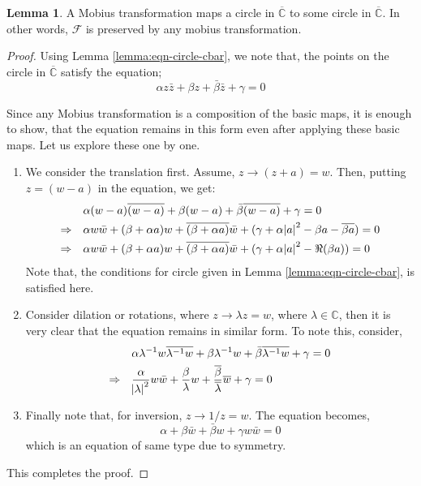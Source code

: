 \documentclass[12pt]{article}
\newcommand{\C}{\mathbb{C}}
\newcommand{\Cinf}{\overline{\C}}
\theoremstyle{definition}
\newtheorem{lem}{Lemma}
\newenvironment{lemma}{
\begin{tcolorbox}[colback=green!5!white,colframe=green!75!black, parbox = false]\begin{lem} }{\end{lem}\end{tcolorbox} }
\begin{document}
\begin{lemma}
    A Mobius transformation maps a circle in $\Cinf$ to some circle in $\Cinf$. In other words, $\mathcal{F}$ is preserved by any mobius transformation.
    \label{lemma:mobius-circ-to-circ}
\end{lemma}

\begin{proof}
    Using Lemma \ref{lemma:eqn-circle-cbar}, we note that, the points on the circle in $\Cinf$ satisfy the equation;
    $$\alpha z \bar{z} + \beta z + \bar{\beta}\bar{z} + \gamma = 0$$
    
    Since any Mobius transformation is a composition of the basic maps, it is enough to show, that the equation remains in this form even after applying these basic maps. Let us explore these one by one.
    
    \begin{enumerate}
        \item We consider the translation first. Assume, $z \rightarrow (z + a) = w$. Then, putting $z = (w - a)$ in the equation, we get: 
        \begin{align*}
            & \quad \alpha (w-a) \overline{(w - a)} + \beta (w - a) + \bar{\beta}\overline{(w - a)} + \gamma = 0\\
            \Rightarrow &\quad  \alpha w\bar{w} + (\beta + \alpha a) w + \overline{(\beta + \alpha a)} \bar{w} + (\gamma + \alpha \abs{a}^2 - \beta a - \overline{\beta a}) = 0\\
            \Rightarrow & \quad \alpha w\bar{w} + (\beta + \alpha a) w + \overline{(\beta + \alpha a)} \bar{w} + (\gamma + \alpha \abs{a}^2 - \Re{(\beta a)}) = 0
        \end{align*}
        Note that, the conditions for circle given in Lemma \ref{lemma:eqn-circle-cbar}, is satisfied here.
        
        \item Consider dilation or rotations, where $z \rightarrow \lambda z = w$, where $\lambda \in \C$, then it is very clear that the equation remains in similar form. To note this, consider,
        \begin{align*}
            & \quad \alpha \lambda^{-1} w \overline{\lambda^{-1} w} + \beta \lambda^{-1} w + \bar{\beta}\overline{\lambda^{-1} w} + \gamma = 0\\
            \Rightarrow &\quad  \dfrac{\alpha}{\abs{\lambda}^2} w\bar{w} + \dfrac{\beta}{\lambda} w + \dfrac{\overline{\beta}}{\overline{\lambda}}\overline{w} + \gamma = 0
        \end{align*}
        \item Finally note that, for inversion, $z \rightarrow 1/z = w$. The equation becomes,
        $$\alpha + \beta \bar{w} + \bar{\beta} w + \gamma w\bar{w} = 0$$
        which is an equation of same type due to symmetry.
    \end{enumerate}
    
    This completes the proof.
\end{proof}
\end{document}
